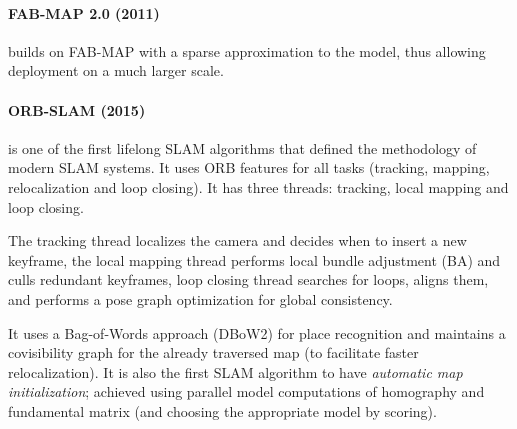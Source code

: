 \paragraph{FAB-MAP 2.0 (2011) \cite{Cummins2011AppearanceonlySA}}
builds on FAB-MAP with a sparse approximation to the model, thus
allowing deployment on a much larger scale.



\paragraph{ORB-SLAM (2015) \cite{MurArtal2015ORBSLAMAV}} is one of the
first lifelong SLAM algorithms that defined the methodology of modern
SLAM systems. It uses ORB features \cite{Rublee2011ORBAE} for all
tasks (tracking, mapping, relocalization and loop closing). It has
three threads: tracking, local mapping and loop closing. 

The tracking thread localizes the camera and decides when to insert a
new keyframe, the local mapping thread performs local bundle
adjustment (BA) and culls redundant keyframes, loop closing thread
searches for loops, aligns them, and performs a pose graph
optimization for global consistency. 

It uses a Bag-of-Words approach (DBoW2) for place recognition and
maintains a covisibility graph for the already traversed map (to
facilitate faster relocalization). It is also the first SLAM algorithm
to have \emph{automatic map initialization}; achieved using parallel
model computations of homography and fundamental matrix (and choosing
the appropriate model by scoring).

